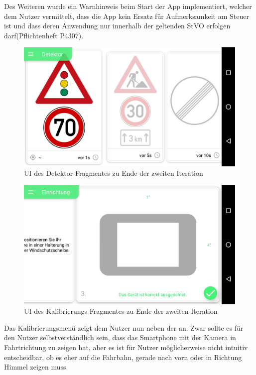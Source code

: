 \documentclass[12pt,a4paper,ngerman,enabledeprecatedfontcommands]{scrreprt}
\begin{document}
Des Weiteren wurde ein Warnhinweis beim Start der \gls{App} implementiert, welcher dem Nutzer vermittelt, dass die \gls{App} kein Ersatz für Aufmerksamkeit am Steuer ist und dass deren Anwendung nur innerhalb der geltenden StVO erfolgen darf(Pflichtenheft P4307).

\begin{figure}[H]
\centering
\includegraphics[width=0.9\linewidth]{Reviewdokument/Grafiken/app_detektor_neu.png}
\caption{UI des Detektor-Fragmentes zu Ende der zweiten Iteration}
\end{figure}


\begin{figure}[H]
\centering
\includegraphics[width=0.9\linewidth]{Reviewdokument/Grafiken/app_setup_neu.png}
\caption{UI des Kalibrierungs-Fragmentes zu Ende der zweiten Iteration}
\end{figure}

Das Kalibrierungsmenü zeigt dem \gls{Nutzer} nun neben der  an. Zwar sollte es für den \gls{Nutzer} selbstverständlich sein, dass das \gls{Smartphone} mit der Kamera in Fahrtrichtung zu zeigen hat, aber es ist für Nutzer möglicherweise nicht intuitiv entscheidbar, ob es eher auf die Fahrbahn, gerade nach vorn oder in Richtung Himmel zeigen muss.\\
\end{document}
